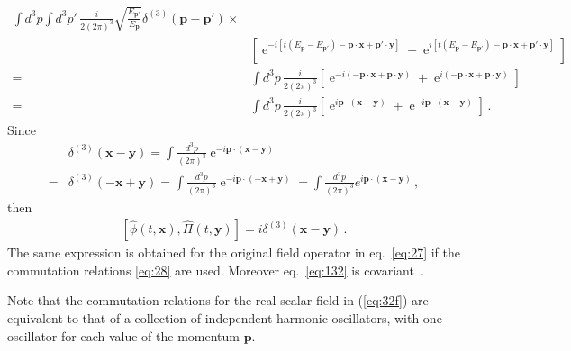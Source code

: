 \begin{frame}
\begin{align}
\int d^3p\int d^3p'\,\frac{i}{2(2\pi)^3}\sqrt{\frac{E_{\mathbf{p}'}}{E_{\mathbf{p}}}}\delta^{(3)}(\mathbf{p}-\mathbf{p}')
\times\nonumber\\
&\left[
\operatorname{e}^{-i [t(E_{\mathbf{p}}-E_{\mathbf{p}'})-\mathbf{p}\cdot \mathbf{x}+ \mathbf{p}'\cdot \mathbf{y} ] }
+\operatorname{e}^{i[ t(E_{\mathbf{p}}-E_{\mathbf{p}'})-\mathbf{p}\cdot \mathbf{x}+ \mathbf{p}'\cdot \mathbf{y}] }
\right]\nonumber\\
=&\int d^3p\,\frac{i}{2(2\pi)^3}
\left[
\operatorname{e}^{-i (-\mathbf{p}\cdot \mathbf{x}+ \mathbf{p}\cdot \mathbf{y} ) }
+\operatorname{e}^{i(-\mathbf{p}\cdot \mathbf{x}+ \mathbf{p}\cdot \mathbf{y}) }
\right]\nonumber\\
=&\int d^3p\,\frac{i}{2(2\pi)^3}
\left[
\operatorname{e}^{i \mathbf{p}\cdot( \mathbf{x}- \mathbf{y} ) }
+\operatorname{e}^{-i\mathbf{p}\cdot( \mathbf{x}-  \mathbf{y}) }
\right]\,.
\end{align}
Since
\begin{align}
 & \delta^{(3)}(\mathbf{x}-\mathbf{y})=\int\frac{d^3p}{(2\pi)^3}\operatorname{e}^{-i\mathbf{p}\cdot(\mathbf{x}-\mathbf{y})}\nonumber\\
=&\delta^{(3)}(-\mathbf{x}+\mathbf{y})=\int\frac{d^3p}{(2\pi)^3}\operatorname{e}^{-i\mathbf{p}\cdot(-\mathbf{x}+\mathbf{y})}=
\int\frac{d^3p}{(2\pi)^3}e^{i\mathbf{p}\cdot(\mathbf{x}-\mathbf{y})}\,,
\end{align}
then
\begin{align}
\label{eq:132}
    \left[\widehat{\phi}(t,\mathbf{x}),\widehat{\Pi}(t,\mathbf{y})\right]=i\delta^{(3)}(\mathbf{x}-\mathbf{y})\,.
\end{align}
The same expression is obtained for the original field operator in eq.~\eqref{eq:27} if the commutation relations \eqref{eq:28} are used. Moreover eq.~\eqref{eq:132} is covariant~\cite{Lahiri:2005sm}.

Note that the commutation relations for the real scalar field in (\ref{eq:32f}) are equivalent to that of a collection of independent harmonic oscillators, with one oscillator for each value of the momentum $\mathbf{p}$.


\end{frame}
